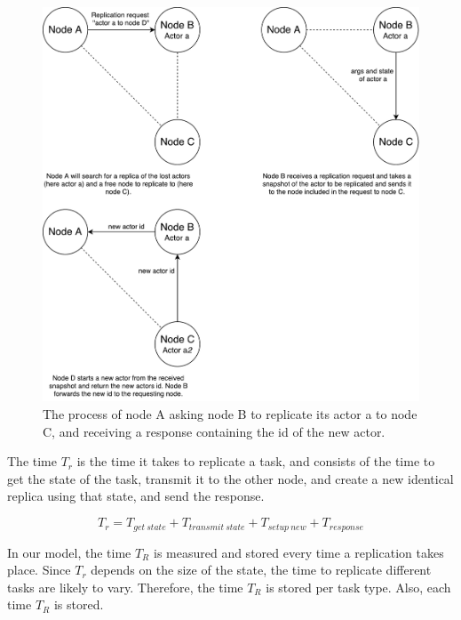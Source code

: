 \documentclass{cslthse-msc}
\begin{document}
\begin{figure}[!hbt]
\centering
\includegraphics[scale=0.5]{images/replication_request.pdf}
\caption{The process of node A asking node B to replicate its actor a to node C, and receiving a response containing the id of the new actor.}\label{fig:replication_request}
\end{figure}

The time $T_r$ is the time it takes to replicate a task, and consists of the time to get the state of the task, transmit it to the other node, and create a new identical replica using that state, and send the response. 

\begin{equation} \label{eq:replication_time}
T_{r} = T_{get\ state} + T_{transmit\ state} + T_{setup\ new} + T_{response}
\end{equation} 

In our model, the time $T_{R}$ is measured and stored every time a replication takes place. Since $T_{r}$ depends on the size of the state, the time to replicate different tasks are likely to vary. Therefore, the time $T_{R}$ is stored per task type. Also, each time $T_R$ is stored.
\end{document}
